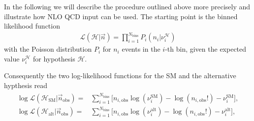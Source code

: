 \documentclass[preprint]{JHEP3} %
\newcommand{\SM}{\mathrm{SM}}
\newcommand{\alt}{\mathrm{alt}}
\def\HSM{\mathcal{H}_{\mathrm{SM}}}
\def\Halt{\mathcal{H}_{\mathrm{alt}}}
\newcommand{\be}{\begin{eqnarray}}
\newcommand{\ee}{\end{eqnarray}}
\begin{document}
In the following we will describe the procedure outlined above more precisely and illustrate how NLO QCD input can be used.
The starting point is the binned likelihood function 
\be
\label{lili}
   \mathcal{L}(\mathcal{H}|\vec{n}) = \prod_{i=1}^{N_\mathrm{bins}} P_i(n_i|\nu_{i}^\mathcal{H})
\ee
with the Poisson distribution $P_i$ for $n_i$ events in the $i$-th bin, given the expected value $\nu_{i}^\mathcal{H}$ for hypothesis $\mathcal{H}$. 

Consequently the two log-likelihood functions for the SM and the alternative hypthesis read
\be
\label{lilifunct}
\begin{split}
  \log\mathcal{L}(\HSM |\vec{n}_\mathrm{obs})  =& \sum_{i=1}^{N_\mathrm{bins}} \bigl[ n_{i,\mathrm{obs}}\log(\nu_i^{\SM}) -\log(n_{i,\mathrm{obs}}!) -\nu_i^{\SM}  \bigr], \\
  \log\mathcal{L}(\Halt|\vec{n}_\mathrm{obs})  =& \sum_{i=1}^{N_\mathrm{bins}} \bigl[ n_{i,\mathrm{obs}}\log(\nu_i^{\alt})-\log(n_{i,\mathrm{obs}}!) -\nu_i^{\alt} \bigr],
\end{split}
\ee
\end{document}
